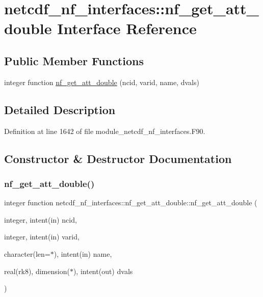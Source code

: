 \hypertarget{interfacenetcdf__nf__interfaces_1_1nf__get__att__double}{}\section{netcdf\+\_\+nf\+\_\+interfaces\+:\+:nf\+\_\+get\+\_\+att\+\_\+double Interface Reference}
\label{interfacenetcdf__nf__interfaces_1_1nf__get__att__double}
\subsection*{Public Member Functions}
\begin{DoxyCompactItemize}
\item 
integer function \hyperlink{interfacenetcdf__nf__interfaces_1_1nf__get__att__double_a7cb3de1414d43b2776c5ab1181aa459a}{nf\+\_\+get\+\_\+att\+\_\+double} (ncid, varid, name, dvals)
\end{DoxyCompactItemize}


\subsection{Detailed Description}


Definition at line 1642 of file module\+\_\+netcdf\+\_\+nf\+\_\+interfaces.\+F90.



\subsection{Constructor \& Destructor Documentation}
\mbox{\label{interfacenetcdf__nf__interfaces_1_1nf__get__att__double_a7cb3de1414d43b2776c5ab1181aa459a}} 
\subsubsection{\texorpdfstring{nf\+\_\+get\+\_\+att\+\_\+double()}{nf\_get\_att\_double()}}
{\footnotesize\ttfamily integer function netcdf\+\_\+nf\+\_\+interfaces\+::nf\+\_\+get\+\_\+att\+\_\+double\+::nf\+\_\+get\+\_\+att\+\_\+double (\begin{DoxyParamCaption}\item[{integer, intent(in)}]{ncid,  }\item[{integer, intent(in)}]{varid,  }\item[{character(len=$\ast$), intent(in)}]{name,  }\item[{real(rk8), dimension($\ast$), intent(out)}]{dvals }\end{DoxyParamCaption})}



